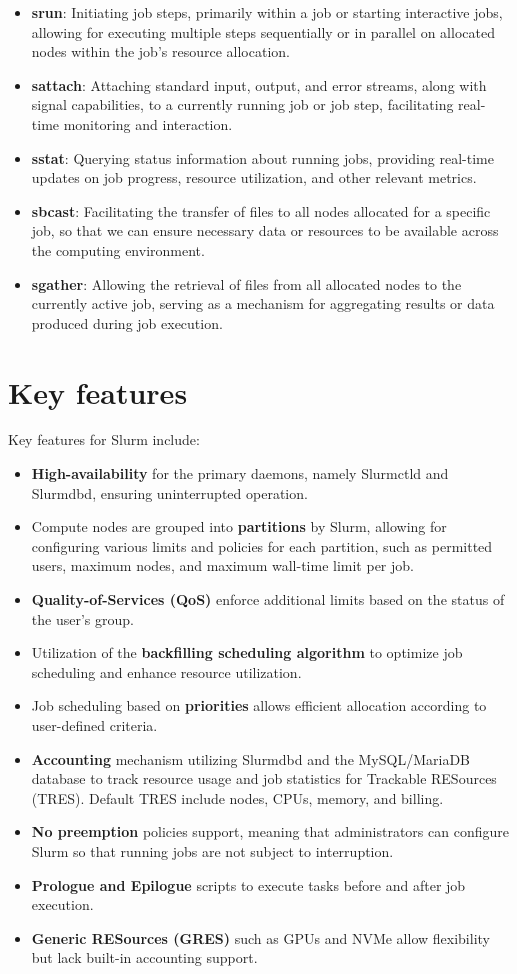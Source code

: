 \begin{itemize}
    \item \textbf{srun}: Initiating job steps, primarily within a job or starting interactive jobs, allowing for executing multiple steps sequentially or in parallel on allocated nodes within the job's resource allocation.
    \item \textbf{sattach}: Attaching standard input, output, and error streams, along with signal capabilities, to a currently running job or job step, facilitating real-time monitoring and interaction.
    \item \textbf{sstat}: Querying status information about running jobs, providing real-time updates on job progress, resource utilization, and other relevant metrics.
    \item \textbf{sbcast}: Facilitating the transfer of files to all nodes allocated for a specific job, so that we can ensure necessary data or resources to be available across the computing environment.
    \item \textbf{sgather}: Allowing the retrieval of files from all allocated nodes to the currently active job, serving as a mechanism for aggregating results or data produced during job execution.
\end{itemize}

\section{Key features}
Key features for Slurm include:
\begin{itemize}
    \item \textbf{High-availability} for the primary daemons, namely Slurmctld and Slurmdbd, ensuring uninterrupted operation.
    \item Compute nodes are grouped into \textbf{partitions} by Slurm, allowing for configuring various limits and policies for each partition, such as permitted users, maximum nodes, and maximum wall-time limit per job.
    \item \textbf{Quality-of-Services (QoS)} enforce additional limits based on the status of the user's group.
    \item Utilization of the \textbf{backfilling scheduling algorithm} to optimize job scheduling and enhance resource utilization.
    \item Job scheduling based on \textbf{priorities} allows efficient allocation according to user-defined criteria.
    \item \textbf{Accounting} mechanism utilizing Slurmdbd and the MySQL/MariaDB database to track resource usage and job statistics for Trackable RESources (TRES). Default TRES include nodes, CPUs, memory, and billing.
    \item \textbf{No preemption} policies support, meaning that administrators can configure Slurm so that running jobs are not subject to interruption.
    \item \textbf{Prologue and Epilogue} scripts to execute tasks before and after job execution.
    \item \textbf{Generic RESources (GRES)} such as GPUs and NVMe allow flexibility but lack built-in accounting support.
\end{itemize}

